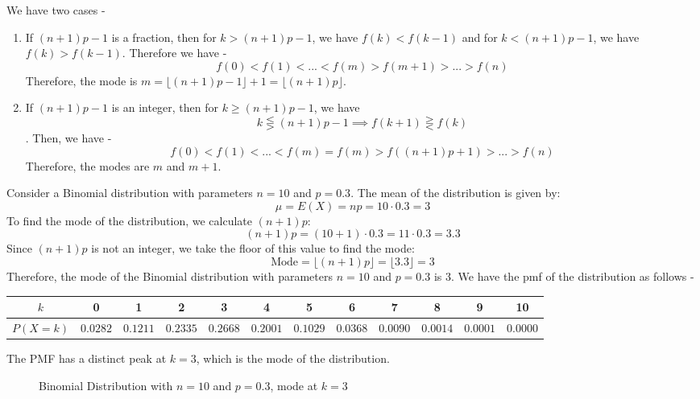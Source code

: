 \documentclass[openany]{book}
\begin{document}
We have two cases - 
\begin{enumerate}
    \item If $(n+1)p - 1$ is a fraction, then for $k > (n+1)p - 1$, we have $f(k) < f(k-1)$ and for $k < (n+1)p - 1$, we have $f(k) > f(k-1)$. Therefore we have - 
    $$f(0) < f(1) < ... < f(m) > f(m+1) > ... > f(n)$$
    Therefore, the mode is $m = \lfloor (n+1)p - 1 \rfloor + 1 = \lfloor (n+1)p \rfloor$.
    \item If $(n+1)p - 1$ is an integer, then for $k \geq (n+1)p - 1$, we have $$k \lesseqgtr (n+1)p - 1 \implies f(k+1) \gtreqless f(k)$$. Then, we have - 
    $$f(0) < f(1) < ... < f(m) = f(m) > f((n+1)p + 1) > ... > f(n)$$
    Therefore, the modes are $m$ and $m+1$. 
\end{enumerate}
\begin{example}
    Consider a Binomial distribution with parameters $n = 10$ and $p = 0.3$. The mean of the distribution is given by:
    $$\mu = E(X) = np = 10 \cdot 0.3 = 3$$
    To find the mode of the distribution, we calculate $(n + 1)p$:
    $$(n + 1)p = (10 + 1) \cdot 0.3 = 11 \cdot 0.3 = 3.3$$
    Since $(n + 1)p$ is not an integer, we take the floor of this value to find the mode:
    $$\text{Mode} = \lfloor (n + 1)p \rfloor = \lfloor 3.3 \rfloor = 3$$
    Therefore, the mode of the Binomial distribution with parameters $n = 10$ and $p = 0.3$ is 3.
    We have the pmf of the distribution as follows -
    \begin{table}[H]
        \centering
        \begin{tabular}{c|ccccccccccc}
            $k$ & 0 & 1 & 2 & 3 & 4 & 5 & 6 & 7 & 8 & 9 & 10 \\
            \hline
            $P(X = k)$ & $0.0282$ & $0.1211$ & $0.2335$ & $0.2668$ & $0.2001$ & $0.1029$ & $0.0368$ & $0.0090$ & $0.0014$ & $0.0001$ & $0.0000$ \\
        \end{tabular}
    \end{table}
    The PMF has a distinct peak at $k = 3$, which is the mode of the distribution.
    \begin{figure}[H]
        \centering
        \caption{Binomial Distribution with $n = 10$ and $p = 0.3$, mode at $k = 3$}
    \end{figure}
\end{example}
\end{document}
